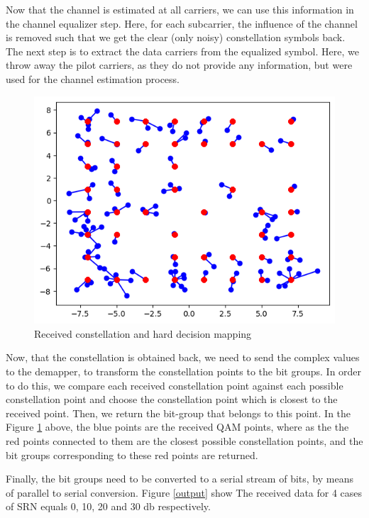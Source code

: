 Now that the channel is estimated at all carriers, we can use this information in the channel equalizer step. Here, for each subcarrier, the influence of the channel is removed such that we get the clear (only noisy) constellation symbols back. The next step is to extract the data carriers from the equalized symbol. Here, we throw away the pilot carriers, as they do not provide any information, but were used for the channel estimation process.

\begin{figure}[htbp]
    \centering
    \includegraphics[width=\linewidth]{../Source/results/demapping}
    \caption{Received constellation and hard decision mapping}
    \label{received}
\end{figure}

Now, that the constellation is obtained back, we need to send the complex values to the demapper, to transform the constellation points to the bit groups. In order to do this, we compare each received constellation point against each possible constellation point and choose the constellation point which is closest to the received point. Then, we return the bit-group that belongs to this point. In the Figure \ref{received} above, the blue points are the received QAM points, where as the the red points connected to them are the closest possible constellation points, and the bit groups corresponding to these red points are returned.

Finally, the bit groups need to be converted to a serial stream of bits, by means of parallel to serial conversion. Figure \ref{output} show The received data for 4 cases of SRN equals 0, 10, 20 and 30 db respectively.

